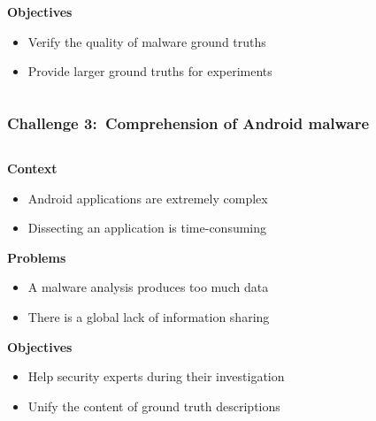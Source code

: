 \begin{frame}
\begin{columns}
\begin{column}{0.8\textwidth}
            \begin{block}{}
                \centering
                \textbf{Objectives}
            \end{block}
            \begin{itemize}
                \item Verify the quality of malware ground truths
                \item Provide larger ground truths for experiments
            \end{itemize}
        \end{column}
    \end{columns}

\end{frame}

\begin{frame}
    \frametitle{Challenge 3:~Comprehension of Android malware}

    \begin{columns}
        \begin{column}{0.8\textwidth}
            \begin{block}{}
                \centering
                \textbf{Context}
            \end{block}
            \begin{itemize}
                \item Android applications are extremely complex
                \item Dissecting an application is time-consuming
            \end{itemize}

            \begin{block}{}
                \centering
                \textbf{Problems}
            \end{block}
            \begin{itemize}
                \item A malware analysis produces too much data
                \item There is a global lack of information sharing
            \end{itemize}

            \begin{block}{}
                \centering
                \textbf{Objectives}
            \end{block}
            \begin{itemize}
                \item Help security experts during their investigation
                \item Unify the content of ground truth descriptions
            \end{itemize}
        \end{column}


\end{columns}
\end{frame}
